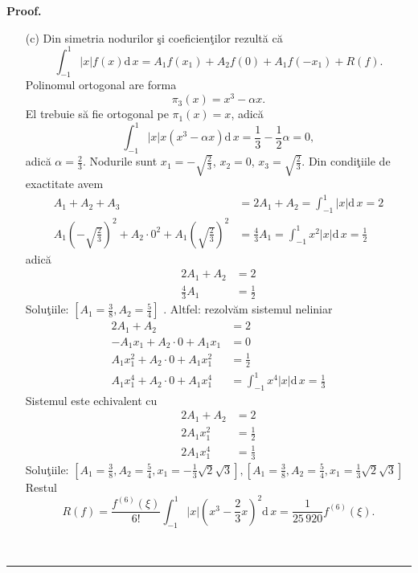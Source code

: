 \documentclass[12pt]{article}%
\newenvironment{proof}[1][Proof]{\noindent\textbf{#1.} }{\ \rule{0.5em}{0.5em}}
\begin{document}
\begin{proof}
\begin{enumerate}
\item[(c)] Din simetria nodurilor \c{s}i coeficien\c{t}ilor rezult\u{a} c\u{a}%
\[
\int_{-1}^{1}\left\vert x\right\vert f(x)\mathrm{d}\,x=A_{1}f(x_{1}%
)+A_{2}f(0)+A_{1}f(-x_{1})+R(f).
\]
Polinomul ortogonal are forma
\[
\pi_{3}(x)=x^{3}-\alpha x.
\]
El trebuie s\u{a} fie ortogonal pe $\pi_{1}(x)=x$, adic\u{a}%
\[
\int_{-1}^{1}\left\vert x\right\vert x\left(  x^{3}-\alpha x\right)
\mathrm{d}\,x=\frac{1}{3}-\frac{1}{2}\alpha=0,
\]
adic\u{a} $\alpha=\frac{2}{3}$. Nodurile sunt $x_{1}=-\sqrt{\frac{2}{3}}$,
$x_{2}=0$, $x_{3}=\sqrt{\frac{2}{3}}$. Din condi\c{t}iile de exactitate avem%
\begin{align*}
A_{1}+A_{2}+A_{3}  & =2A_{1}+A_{2}=\int_{-1}^{1}\left\vert x\right\vert
\mathrm{d}\,x=2\\
A_{1}\left(  -\sqrt{\frac{2}{3}}\right)  ^{2}+A_{2}\cdot0^{2}+A_{1}\left(
\sqrt{\frac{2}{3}}\right)  ^{2}  & =\frac{4}{3}A_{1}=\int_{-1}^{1}%
x^{2}\left\vert x\right\vert \mathrm{d}\,x=\frac{1}{2}%
\end{align*}
adic\u{a}%
\begin{align*}
2A_{1}+A_{2}  & =2\\
\frac{4}{3}A_{1}  & =\frac{1}{2}%
\end{align*}
Solu\c{t}iile: $\left[  A_{1}=\frac{3}{8},A_{2}=\frac{5}{4}\right]  $ .
Altfel: rezolv\u{a}m sistemul neliniar%
\begin{align*}
2A_{1}+A_{2}  & =2\\
-A_{1}x_{1}+A_{2}\cdot0+A_{1}x_{1}  & =0\\
A_{1}x_{1}^{2}+A_{2}\cdot0+A_{1}x_{1}^{2}  & =\frac{1}{2}\\
A_{1}x_{1}^{4}+A_{2}\cdot0+A_{1}x_{1}^{4}  & =\int_{-1}^{1}x^{4}\left\vert
x\right\vert \mathrm{d}\,x=\frac{1}{3}%
\end{align*}
Sistemul este echivalent cu%
\begin{align*}
2A_{1}+A_{2}  & =2\\
2A_{1}x_{1}^{2}  & =\frac{1}{2}\\
2A_{1}x_{1}^{4}  & =\frac{1}{3}%
\end{align*}
Solu\c{t}iile: $\left[  A_{1}=\frac{3}{8},A_{2}=\frac{5}{4},x_{1}=-\frac{1}%
{3}\sqrt{2}\sqrt{3}\right]  ,\left[  A_{1}=\frac{3}{8},A_{2}=\frac{5}{4}%
,x_{1}=\frac{1}{3}\sqrt{2}\sqrt{3}\right]  \allowbreak$ \\ Restul%
\[
R(f)=\frac{f^{(6)}(\xi)}{6!}\int_{-1}^{1}\left\vert x\right\vert \left(
x^{3}-\frac{2}{3}x\right)  ^{2}\mathrm{d}\,x=\frac{1}{25\,920}f^{(6)}(\xi).
\]

\end{enumerate}

\newline
\end{proof}
\end{document}
